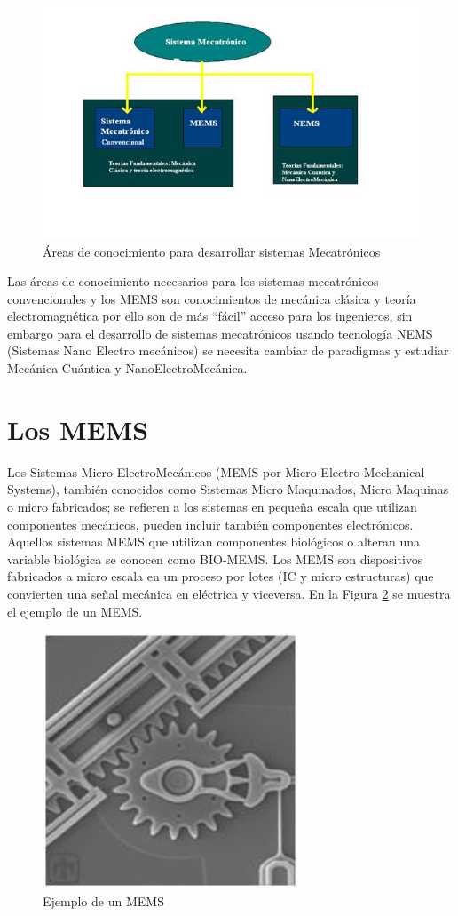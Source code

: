\documentclass[12pt]{book}
\theoremstyle{definition}
\theoremstyle{remark}
\theoremstyle{plain}
\begin{document}
\begin{figure}
\centering
\includegraphics[width=4.5in]{micromecatronica.jpg}
\caption{Áreas de conocimiento para desarrollar sistemas Mecatrónicos}
\label{fig1}
\end{figure}

Las áreas de conocimiento necesarios para los sistemas mecatrónicos convencionales y los MEMS son conocimientos de mecánica clásica y teoría electromagnética por ello son de más “fácil” acceso para los ingenieros, sin embargo para el desarrollo de sistemas mecatrónicos usando tecnología NEMS (Sistemas Nano Electro mecánicos) se necesita cambiar de paradigmas y estudiar Mecánica Cuántica y NanoElectroMecánica.

\section{Los MEMS}

Los Sistemas Micro ElectroMecánicos (MEMS por Micro Electro-Mechanical Systems), también conocidos como Sistemas Micro Maquinados, Micro Maquinas o micro fabricados; se refieren a los sistemas en pequeña escala que utilizan componentes mecánicos, pueden incluir también componentes electrónicos. Aquellos sistemas MEMS que utilizan componentes biológicos o alteran una variable biológica se conocen como BIO-MEMS.
Los MEMS son dispositivos fabricados a micro escala en un proceso por lotes (IC y micro estructuras) que convierten una señal mecánica en eléctrica y viceversa. En la Figura \ref{fig2} se muestra el ejemplo de un MEMS.

\begin{figure}
\centering
\includegraphics[width=3in]{mems1.jpg}
\caption{Ejemplo de un MEMS}
\label{fig2}
\end{figure}
\end{document}
